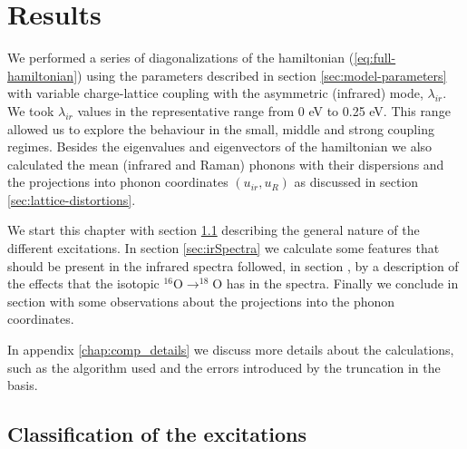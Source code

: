 \chapter{Results}
\label{chap:results}

We performed a series of diagonalizations of the hamiltonian (\ref{eq:full-hamiltonian}) using the parameters described in section \ref{sec:model-parameters} with variable charge-lattice coupling with the asymmetric (infrared) mode, $\lambda_{ir}$. 
We took $\lambda_{ir}$ values in the representative range from 0 eV to 0.25 eV. 
This range allowed us to explore the behaviour in the small, middle and strong coupling regimes. 
Besides the eigenvalues and eigenvectors of the hamiltonian we also calculated the mean (infrared and Raman) phonons with their dispersions and the projections into phonon coordinates $(u_{ir}, u_R)$ as discussed in section \ref{sec:lattice-distortions}.

We start this chapter with section \ref{sec:classification} describing the general nature of the different excitations. 
In section \ref{sec:irSpectra} we calculate some features that should be present in the infrared spectra followed, in section \label{sec:irIsotopicShifts}, by a description of the effects that the isotopic $^{16}$O$\rightarrow ^{18}$O has in the spectra. 
Finally we conclude in section \label{sec:irPhononProj} with some observations about the projections into the phonon coordinates.

In appendix \ref{chap:comp_details} we discuss more details about the calculations, such as the algorithm used and the errors introduced by the truncation in the basis.

\section{Classification of the excitations}
\label{sec:classification}

